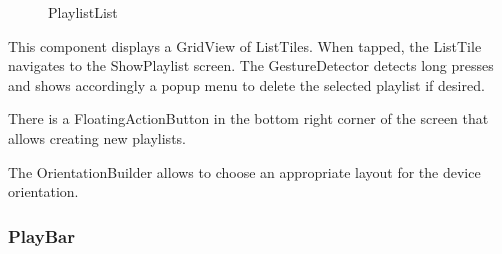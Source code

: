 \documentclass{article}
\begin{document}
\begin{figure}[H]
	\noindent
	\caption{PlaylistList} 
\end{figure}

This component displays a GridView of ListTiles. When tapped, the ListTile
navigates to the ShowPlaylist screen. The GestureDetector detects long presses
and shows accordingly a popup menu to delete the selected playlist if desired.

There is a FloatingActionButton in the bottom right corner of the screen that
allows creating new playlists.

The OrientationBuilder allows to choose an appropriate layout for the device
orientation.

\subsubsection{PlayBar}
\end{document}
